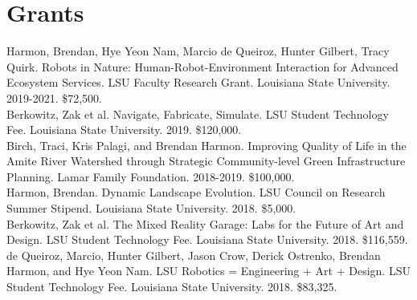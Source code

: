 \documentclass[]{baharmon-cv}
\begin{document}
%

\sectiondivider


\section{Grants} 

Harmon, Brendan, Hye Yeon Nam, Marcio de Queiroz, Hunter Gilbert, Tracy Quirk. Robots in Nature: Human-Robot-Environment Interaction for Advanced Ecosystem Services. LSU Faculty Research Grant. Louisiana State University. 2019-2021. \$72,500.\\

Berkowitz, Zak et al. Navigate, Fabricate, Simulate. LSU Student Technology Fee. Louisiana State University. 2019.	\$120,000.\\

Birch, Traci, Kris Palagi, and Brendan Harmon. Improving Quality of Life in the Amite River Watershed through Strategic Community-level Green Infrastructure Planning. Lamar Family Foundation. 2018-2019. \$100,000.\\

Harmon, Brendan. Dynamic Landscape Evolution. LSU Council on Research Summer Stipend. Louisiana State University. 2018. \$5,000.\\

Berkowitz, Zak et al. The Mixed Reality Garage: Labs for the Future of Art and Design. LSU Student Technology Fee. Louisiana State University. 2018. \$116,559.\\

de Queiroz, Marcio, Hunter Gilbert, Jason Crow, Derick Ostrenko, Brendan Harmon, and Hye Yeon Nam. LSU Robotics = Engineering + Art + Design. LSU Student Technology Fee. Louisiana State University. 2018. \$83,325.\\
\end{document}
